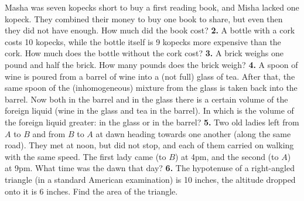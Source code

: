 \documentclass[12pt]{article}  %
\begin{document}
{} Masha was seven kopecks short to buy a first reading book, and Misha lacked one kopeck.
They combined their money to buy one book to share, but even then they did not have enough.
How much did the book cost?
\newline\newline
{\bf 2.} A bottle with a cork costs 10 kopecks, while the bottle itself is 9 kopecks more expensive
than the cork. How much does the bottle without the cork cost?
\newline\newline{}\quad
{\bf 3.} A brick weighs one pound and half the brick. How many pounds does the brick weigh?
\newline\newline\quad
{\bf 4.} A spoon of wine is poured from a barrel of wine into a (not full) glass of tea.
After that, the same spoon of the (inhomogeneous) mixture from the glass is taken back into the barrel.
Now both in the barrel and in the glass there is a certain volume of the foreign liquid (wine in the glass and
tea in the barrel). In which is the volume of the foreign liquid greater: in the glass or in the barrel?
\newline\newline\quad
{\bf 5.} Two old ladies left from $A$ to $B$ and from $B$ to $A$ at dawn
heading towards one another (along the same road). They met at noon,
but did not stop, and each of them carried on walking with the same speed.
The first lady came (to $B$) at 4pm, and the second (to $A$) at 9pm. What time was the dawn that day? 
\newline\newline\quad
{\bf 6.} The hypotenuse of a right-angled triangle (in a standard American examination) is 10 inches,
the altitude dropped onto it is 6 inches. Find the area of the triangle.
\end{document}
